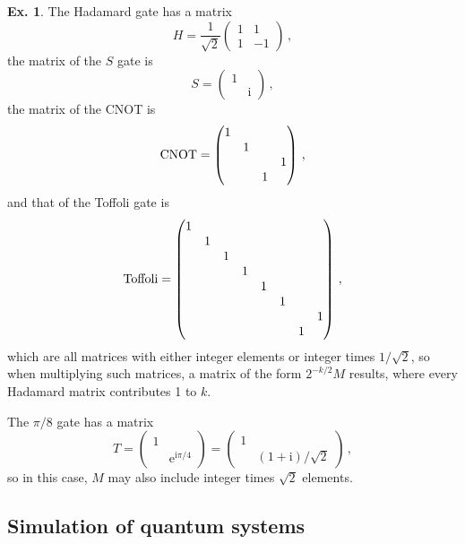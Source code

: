 \documentclass[a4paper,12pt]{article}
\def\e{\mathrm{e}}
\def\imagi{\mathrm{i}}
\theoremstyle{definition}
\newtheorem{exercise}{Ex.}[section]
\begin{document}
\begin{exercise}
 The Hadamard gate has a matrix
 \[
  H=\frac{1}{\sqrt{2}}\begin{pmatrix} 1 & 1 \\ 1 & -1 \end{pmatrix}\,,
 \]
 the matrix of the $S$ gate is
 \[
  S=\begin{pmatrix} 1 & \\ & \imagi \end{pmatrix}\,,
 \]
 the matrix of the CNOT is
 \[
  {\rm CNOT} =
  \begin{pmatrix}
   1 & & & \\
     & 1 & & \\
     &   & & 1\\
     &   & 1 & 
  \end{pmatrix}\,,
 \]
 and that of the Toffoli gate is
 \[
 {\rm Toffoli} =
 \begin{pmatrix}
  1 &   &   &   &   &   &   &   \\
    & 1 &   &   &   &   &   &   \\
    &   & 1 &   &   &   &   &   \\
    &   &   & 1 &   &   &   &   \\
    &   &   &   & 1 &   &   &   \\
    &   &   &   &   & 1 &   &   \\
    &   &   &   &   &   &   & 1 \\
    &   &   &   &   &   & 1 & 
 \end{pmatrix}\,,
 \]
 which are all matrices with either integer elements or integer times $1/\sqrt{2}$, so when multiplying such matrices, a matrix of the form $2^{-k/2} M$ results, where every Hadamard matrix contributes 1 to $k$.
 
 The $\pi/8$ gate has a matrix
 \[
  T = \begin{pmatrix} 1 & \\ & \e^{\imagi\pi/4}\end{pmatrix} = \begin{pmatrix} 1 & \\ & (1+\imagi)/\sqrt{2} \end{pmatrix}\,,
 \]
 so in this case, $M$ may also include integer times $\sqrt{2}$ elements.

\end{exercise}

\subsection{Simulation of quantum systems}\label{ssec:simulationOfQuantumSystems}
\end{document}

